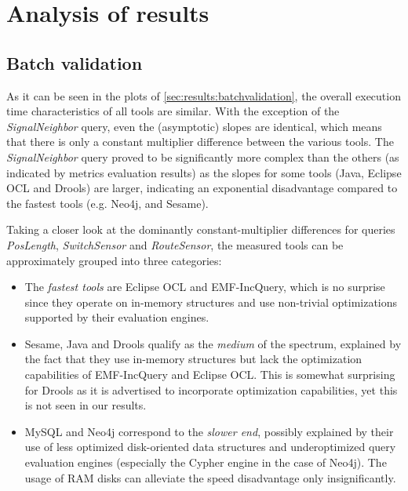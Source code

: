 \section{Analysis of results}
\label{sec:results:analysis}

\subsection{Batch validation}

% 

As it can be seen in the plots of \autoref{sec:results:batchvalidation}, the overall execution time characteristics of all tools are similar. With the exception of the \emph{SignalNeighbor} query, even the (asymptotic) slopes are identical, which means that there is only a constant multiplier difference between the various tools. The \emph{SignalNeighbor} query proved to be significantly more complex than the others (as indicated by metrics evaluation results) as the slopes for some tools (Java, Eclipse OCL and Drools) are larger, indicating an exponential disadvantage compared to the fastest tools (e.g. Neo4j, \eiq{} and Sesame).

Taking a closer look at the dominantly constant-multiplier differences for queries \emph{PosLength}, \emph{SwitchSensor} and \emph{RouteSensor}, the measured tools can be approximately grouped into three categories:
\begin{itemize}
  \item The \emph{fastest tools} are Eclipse OCL and EMF-IncQuery, which is no surprise since they operate on in-memory structures and use non-trivial optimizations supported by their evaluation engines.
  \item Sesame, Java and Drools qualify as the \emph{medium} of the spectrum, explained by the fact that they use in-memory structures but lack the optimization capabilities of EMF-IncQuery and Eclipse OCL. This is somewhat surprising for Drools as it is advertised to incorporate optimization capabilities, yet this is not seen in our results.
  \item MySQL and Neo4j correspond to the \emph{slower end}, possibly explained by their use of less optimized disk-oriented data structures and underoptimized query evaluation engines (especially the Cypher engine in the case of Neo4j). The usage of RAM disks can alleviate the speed disadvantage only insignificantly.
\end{itemize}

